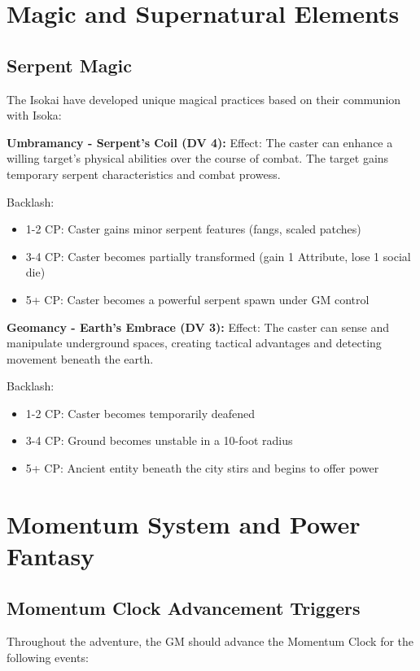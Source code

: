 \documentclass[12pt,twoside]{article}
\begin{document}
\section{Magic and Supernatural Elements}

\subsection{Serpent Magic}

The Isokai have developed unique magical practices based on their communion with Isoka:

\textbf{Umbramancy - Serpent's Coil (DV 4):}
Effect: The caster can enhance a willing target's physical abilities over the course of combat. The target gains temporary serpent characteristics and combat prowess.

Backlash:
\begin{itemize}
  \item 1-2 CP: Caster gains minor serpent features (fangs, scaled patches)
  \item 3-4 CP: Caster becomes partially transformed (gain 1 Attribute, lose 1 social die)
  \item 5+ CP: Caster becomes a powerful serpent spawn under GM control
\end{itemize}

\textbf{Geomancy - Earth's Embrace (DV 3):}
Effect: The caster can sense and manipulate underground spaces, creating tactical advantages and detecting movement beneath the earth.

Backlash:
\begin{itemize}
  \item 1-2 CP: Caster becomes temporarily deafened
  \item 3-4 CP: Ground becomes unstable in a 10-foot radius
  \item 5+ CP: Ancient entity beneath the city stirs and begins to offer power
\end{itemize}

\section{Momentum System and Power Fantasy}

\subsection{Momentum Clock Advancement Triggers}

Throughout the adventure, the GM should advance the Momentum Clock for the following events:
\end{document}
